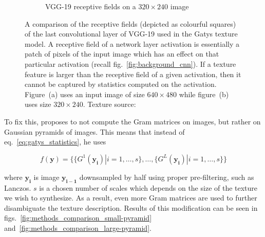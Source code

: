 \begin{figure}[ht]
\begin{subfigure}[b]{0.48\textwidth}
        \caption{VGG-19 receptive fields on a \(320 \times 240\) image}
        \label{fig:methods_receptive_field_lvl1}
    \end{subfigure}
    \caption{A comparison of the receptive fields (depicted as colourful squares) of the last convolutional layer of VGG-19 used in the Gatys texture model. A receptive field of a network layer activation is essentially a patch of pixels of the input image which has an effect on that particular activation (recall fig.~\ref{fig:background_cnn}). If a texture feature is larger than the receptive field of a given activation, then it cannot be captured by statistics computed on the activation. Figure~(a) uses an input image of size \(640 \times 480\) while figure~(b) uses size \(320 \times 240\). Texture source: \citet{Pixar128}}
    \label{fig:methods_receptive_field}
\end{figure}

To fix this, \citet{Snelgrove2017} proposes to not compute the Gram matrices on images, but rather on Gaussian pyramids of images. This means that instead of eq.~\ref{eq:gatys_statistics}, he uses

\begin{equation}
    \label{eq:snelgrove_statistics}
    f(\bm{y}) = \{\{G^1(\bm{y_i}) | i = 1, \dots, s\}, \dots, \{G^L(\bm{y_i}) | i = 1, \dots, s\}\}
\end{equation}

where \(\bm{y_i}\) is image \(\bm{y_{i - 1}}\) downsampled by half using proper pre-filtering, such as Lanczos. \(s\) is a chosen number of scales which depends on the size of the texture we wish to synthesize. As a result, even more Gram matrices are used to further disambiguate the texture description. Results of this modification can be seen in figs.~\ref{fig:methods_comparison_small-pyramid} and~\ref{fig:methods_comparison_large-pyramid}.


